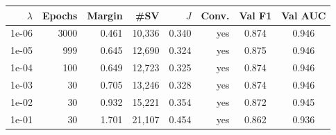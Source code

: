 \begin{tabular}{@{}rrrrrrcc@{}}
\toprule
$\lambda$ & Epochs & Margin & \#SV & $J$ & Conv. & Val F1 & Val AUC \\
\midrule
1e-06 & 3000 & 0.461 & 10,336 & 0.340 & yes & 0.874 & 0.946 \\
1e-05 & 999 & 0.645 & 12,690 & 0.324 & yes & 0.875 & 0.946 \\
1e-04 & 100 & 0.649 & 12,723 & 0.325 & yes & 0.874 & 0.946 \\
1e-03 & 30 & 0.705 & 13,246 & 0.328 & yes & 0.874 & 0.946 \\
1e-02 & 30 & 0.932 & 15,221 & 0.354 & yes & 0.872 & 0.945 \\
1e-01 & 30 & 1.701 & 21,107 & 0.454 & yes & 0.862 & 0.936 \\
\bottomrule
\end{tabular}
